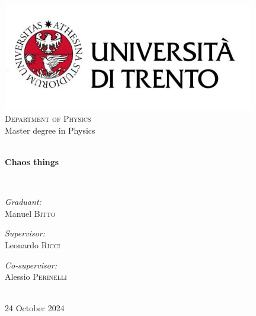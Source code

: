 \begin{titlepage}
    \begin{center}
    
    \includegraphics[width=11cm]{images/Logo Unitn.jpg}\\[1cm]
    
    \textsc{\Large Department of Physics}\\[1.5cm]
    
    {\Large Master degree in Physics}\\[1.5cm]
    
    \hrulefill \\[0.4cm]
    {\huge \bfseries Chaos things\par}\vspace{0.4cm}
    \hrulefill \\[1.5cm]
    
    \begin{minipage}[t]{0.4\textwidth}
    \begin{flushleft} \large
    \emph{Graduant:}\\
    {Manuel \textsc{Bitto}}
    \end{flushleft}
    \end{minipage}
    \begin{minipage}[t]{0.4\textwidth}
    \begin{flushright} \large
    \emph{Supervisor:} \\
    {Leonardo \textsc{Ricci}}
    \end{flushright}
    \begin{flushright}
    \emph{Co-supervisor:}\\
    {Alessio \textsc{Perinelli}}
    \end{flushright}
    \end{minipage}\\[3cm]
    
    \vfill
    {\Large 24 October 2024}
    
    \end{center}
    \end{titlepage}